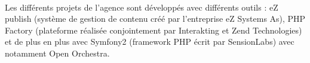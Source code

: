         \paragraph{}
        Les différents projets de l'agence sont développés avec différents outils : eZ publish (système de gestion de contenu créé par l'entreprise eZ Systems As), PHP Factory (plateforme réalisée conjointement par Interakting et Zend Technologies) et de plus en plus avec Symfony2 (framework PHP écrit par SensionLabs) avec notamment Open Orchestra.

        
        
        